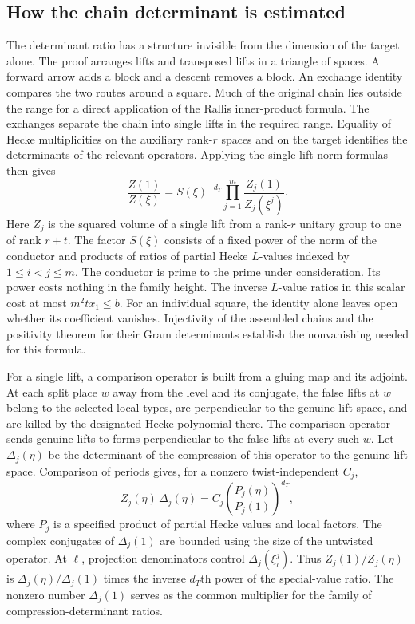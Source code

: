 \documentclass[11pt,letterpaper]{article}
\begin{document}
\subsection{How the chain determinant is estimated}
The determinant ratio has a structure invisible from the dimension of the target alone. The proof arranges lifts and transposed lifts in a triangle of spaces. A forward arrow adds a block and a descent removes a block. An exchange identity compares the two routes around a square. Much of the original chain lies outside the range for a direct application of the Rallis inner-product formula. The exchanges separate the chain into single lifts in the required range. Equality of Hecke multiplicities on the auxiliary rank-$r$ spaces and on the target identifies the determinants of the relevant operators. Applying the single-lift norm formulas then gives
\[
 \frac{Z(1)}{Z(\xi)}
       = S(\xi)^{-d_T}
           \prod_{j=1}^{m}\frac{Z_j(1)}{Z_j(\xi^j)} .
\]
Here $Z_j$ is the squared volume of a single lift from a rank-$r$ unitary group to one of rank $r+t$. The factor $S(\xi)$ consists of a fixed power of the norm of the conductor and products of ratios of partial Hecke $L$-values indexed by $1\le i<j\le m$. The conductor is prime to the prime under consideration. Its power costs nothing in the family height. The inverse $L$-value ratios in this scalar cost at most $m^2 t x_1\le b$. For an individual square, the identity alone leaves open whether its coefficient vanishes. Injectivity of the assembled chains and the positivity theorem for their Gram determinants establish the nonvanishing needed for this formula.

For a single lift, a comparison operator is built from a gluing map and its adjoint. At each split place $w$ away from the level and its conjugate, the false lifts at $w$ belong to the selected local types, are perpendicular to the genuine lift space, and are killed by the designated Hecke polynomial there. The comparison operator sends genuine lifts to forms perpendicular to the false lifts at every such $w$. Let $\Delta_j(\eta)$ be the determinant of the compression of this operator to the genuine lift space. Comparison of periods gives, for a nonzero twist-independent $C_j$,
\[
 Z_j(\eta)\,\Delta_j(\eta)
       = C_j\left(\frac{P_j(\eta)}{P_j(1)}\right)^{d_T},
\]
where $P_j$ is a specified product of partial Hecke values and local factors. The complex conjugates of $\Delta_j(1)$ are bounded using the size of the untwisted operator. At $\ell$, projection denominators control $\Delta_j(\xi_\iota^j)$. Thus $Z_j(1)/Z_j(\eta)$ is $\Delta_j(\eta)/\Delta_j(1)$ times the inverse $d_T$th power of the special-value ratio. The nonzero number $\Delta_j(1)$ serves as the common multiplier for the family of compression-determinant ratios.
\end{document}
